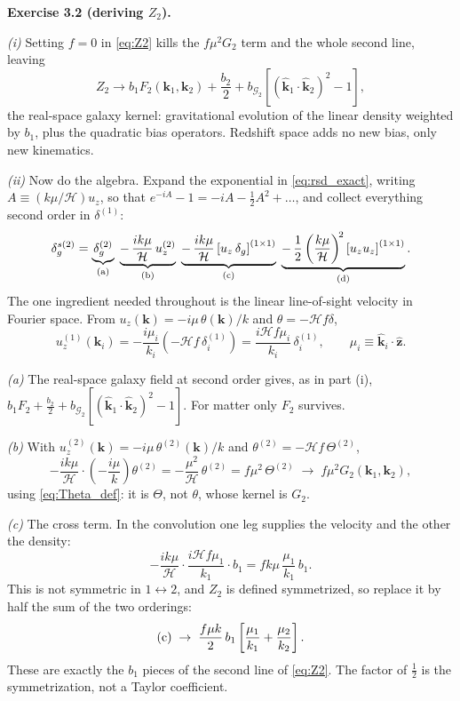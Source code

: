 \documentclass[a4paper,11pt]{article}
\newcommand{\vk}{\bm{k}}
\newcommand{\nhat}{\hat{\bm{z}}}
\newcommand{\khat}{\hat{\bm{k}}}
\def\cH{\mathcal{H}}
\def\G{\mathcal{G}}
\newenvironment{solution}[1]
  {\par\medskip\noindent\textbf{#1}\par\nobreak\smallskip}
  {\par\medskip}
\begin{document}
\begin{solution}{Exercise 3.2 (deriving $Z_2$).}
\emph{(i)} Setting $f = 0$ in \eqref{eq:Z2} kills the $f\mu^2G_2$ term and the
whole second line, leaving
\begin{equation*}
Z_2 \to b_1F_2(\vk_1,\vk_2) + \frac{b_2}{2}
+ b_{\G_2}\left[(\khat_1\cdot\khat_2)^2-1\right] ,
\end{equation*}
the real-space galaxy kernel: gravitational evolution of the linear density
weighted by $b_1$, plus the quadratic bias operators. Redshift space adds no
new bias, only new kinematics.

\emph{(ii)} Now do the algebra. Expand the exponential in \eqref{eq:rsd_exact},
writing $A \equiv (k\mu/\cH)u_z$, so that $e^{-iA}-1 = -iA - \tfrac12 A^2 +
\ldots$, and collect everything second order in $\delta^{(1)}$:
\begin{equation*}
\delta_g^{s(2)}
= \underbrace{\delta_g^{(2)}}_{\rm (a)}
\;\underbrace{-\,\frac{ik\mu}{\cH}\,u_z^{(2)}}_{\rm (b)}
\;\underbrace{-\,\frac{ik\mu}{\cH}\left[u_z\,\delta_g\right]^{(1\times1)}}_{\rm (c)}
\;\underbrace{-\,\frac12\left(\frac{k\mu}{\cH}\right)^{\!2}
\left[u_z u_z\right]^{(1\times1)}}_{\rm (d)} .
\end{equation*}
The one ingredient needed throughout is the linear line-of-sight velocity in
Fourier space. From $u_z(\vk) = -i\mu\,\theta(\vk)/k$ and
$\theta = -\cH f\delta$,
\begin{equation*}
u_z^{(1)}(\vk_i) = -\frac{i\mu_i}{k_i}\left(-\cH f\,\delta^{(1)}_i\right)
= \frac{i\cH f\mu_i}{k_i}\,\delta^{(1)}_i ,
\qquad \mu_i \equiv \khat_i\cdot\nhat .
\end{equation*}

\emph{(a)} The real-space galaxy field at second order gives, as in part (i),
$b_1F_2 + \tfrac{b_2}{2} + b_{\G_2}[(\khat_1\cdot\khat_2)^2-1]$. For matter only
$F_2$ survives.

\emph{(b)} With $u_z^{(2)}(\vk) = -i\mu\,\theta^{(2)}(\vk)/k$ and
$\theta^{(2)} = -\cH f\,\Theta^{(2)}$,
\begin{equation*}
-\frac{ik\mu}{\cH}\cdot\left(-\frac{i\mu}{k}\right)\theta^{(2)}
= -\frac{\mu^2}{\cH}\,\theta^{(2)}
= f\mu^2\,\Theta^{(2)}
\;\longrightarrow\; f\mu^2 G_2(\vk_1,\vk_2) ,
\end{equation*}
using \eqref{eq:Theta_def}: it is $\Theta$, not $\theta$, whose kernel is $G_2$.

\emph{(c)} The cross term. In the convolution one leg supplies the velocity and
the other the density:
\begin{equation*}
-\frac{ik\mu}{\cH}\cdot\frac{i\cH f\mu_1}{k_1}\cdot b_1
= f k\mu\,\frac{\mu_1}{k_1}\,b_1 .
\end{equation*}
This is not symmetric in $1\leftrightarrow2$, and $Z_2$ is defined symmetrized,
so replace it by half the sum of the two orderings:
\begin{equation*}
{\rm (c)} \;\to\; \frac{f\mu k}{2}\,b_1
\left[\frac{\mu_1}{k_1} + \frac{\mu_2}{k_2}\right] .
\end{equation*}
These are exactly the $b_1$ pieces of the second line of \eqref{eq:Z2}. The
factor of $\tfrac12$ is the symmetrization, not a Taylor coefficient.


\end{solution}
\end{document}
